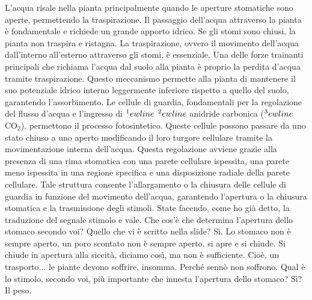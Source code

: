\documentclass[11pt, a4paper]{article}
\begin{document}
\begin{spacing}{1.15}
L'acqua risale nella pianta principalmente quando le aperture stomatiche sono aperte, permettendo la traspirazione. Il passaggio dell'acqua attraverso la pianta è fondamentale e richiede un grande apporto idrico. Se gli stomi sono chiusi, la pianta non traspira e ristagna. La traspirazione, ovvero il movimento dell'acqua dall'interno all'esterno attraverso gli stomi, è essenziale. Una delle forze trainanti principali che richiama l'acqua dal suolo alla pianta è proprio la perdita d'acqua tramite traspirazione. Questo meccanismo permette alla pianta di mantenere il suo potenziale idrico interno leggermente inferiore rispetto a quello del suolo, garantendo l'assorbimento. Le cellule di guardia, fondamentali per la regolazione del flusso d'acqua e l'ingresso di $\footnote{The spoken language was quite clear and didn't present particular issues in the transcription process. Some filler words were removed and sentences were slightly rephrased for better clarity, while ensuring the original meaning was preserved.}
ewline$ $\footnote{The original text contained several disfluencies and repetitions, which were removed to improve clarity. For instance, phrases like "cioè" and "ehm" were omitted.  The fragmented sentence "per parla- per rimane- il mondo vegetale" was reconstructed as "per rimanere nel mondo vegetale". The question "Siamo guardando la traduzione, ma che cosa succede?" was rephrased as "E, una volta avvenuta la traduzione del segnale, su quale effettore agisce?" to better reflect the intended meaning within the context of the lecture.}
ewline$ anidride carbonica ($\footnote{Il testo originale presenta alcune ambiguità. In particolare, non è chiaro cosa venga attivato dall'estrusione di protoni. La frase "Chi si attiva dopo?" rimane senza risposta. Inoltre, il riferimento all'alba e al "consumo di attività di protoni" è poco chiaro e non si capisce come si inserisca nel discorso sulla pompa protonica.}
ewline$ $\text{CO}_2$), permettono il processo fotosintetico. Queste cellule possono passare da uno stato chiuso a uno aperto modificando il loro turgore cellulare tramite la movimentazione interna dell'acqua. Questa regolazione avviene grazie alla presenza di una rima stomatica con una parete cellulare ispessita, una parete meno ispessita in una regione specifica e una disposizione radiale della parete cellulare. Tale struttura consente l'allargamento o la chiusura delle cellule di guardia in funzione del movimento dell'acqua, garantendo l'apertura o la chiusura stomatica e la trasmissione degli stimoli.
State facendo, come ho già detto, la traduzione del segnale stimolo e vale. Che cos'è che determina l'apertura dello stomaco secondo voi? Quello che vi è scritto nella slide? Sì. Lo stomaco non è sempre aperto, un poro scontato non è sempre aperto, si apre e si chiude. Si chiude in apertura alla siccità, diciamo così, ma non è sufficiente. Cioè, un trasporto... le piante devono soffrire, insomma. Perché sennò non soffrono. Qual è lo stimolo, secondo voi, più importante che innesta l'apertura dello stomaco? Sì? Il peso.

\end{spacing}
\end{document}
